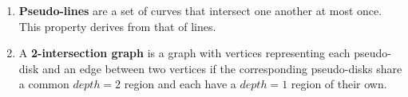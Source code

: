 \documentclass{NSF}
\begin{document}
\begin{enumerate}
\item \textbf{Pseudo-lines} are a set of curves that intersect one another at most once. This property derives from that of lines.
\item A \textbf{2-intersection graph} is a graph with vertices representing each pseudo-disk and an edge between two vertices if the corresponding pseudo-disks share a common $depth=2$ region and each have a $depth=1$ region of their own.

\end{enumerate}


\newpage
\renewcommand\refname{References}


\end{document}
